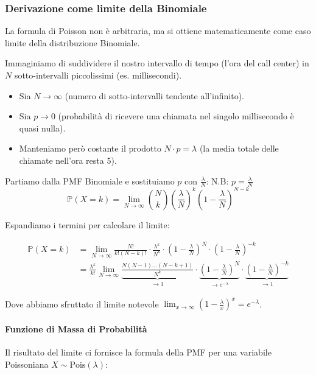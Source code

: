 \subsubsection{Derivazione come limite della Binomiale}

La formula di Poisson non è arbitraria, ma si ottiene matematicamente come caso limite della distribuzione Binomiale.

Immaginiamo di suddividere il nostro intervallo di tempo (l'ora del call center) in $N$ sotto-intervalli piccolissimi (es. millisecondi).
\begin{itemize}
    \item Sia $N \to \infty$ (numero di sotto-intervalli tendente all'infinito).
    \item Sia $p \to 0$ (probabilità di ricevere una chiamata nel singolo millisecondo è quasi nulla).
    \item Manteniamo però costante il prodotto $N \cdot p = \lambda$ (la media totale delle chiamate nell'ora resta 5).
\end{itemize}

Partiamo dalla PMF Binomiale e sostituiamo $p$ con $\frac{\lambda}{N}$:
N.B: ${p} = \frac{\lambda}{N}$
\[
\mathbb{P}(X=k) = \lim_{N \to \infty} \binom{N}{k} \left( \frac{\lambda}{N} \right)^k \left( 1 - \frac{\lambda}{N} \right)^{N-k}
\]

Espandiamo i termini per calcolare il limite:

\begin{equation}
\begin{aligned}
\mathbb{P}(X=k) &= \lim_{N \to \infty} \frac{N!}{k!(N-k)!} \cdot \frac{\lambda^k}{N^k} \cdot \left( 1 - \frac{\lambda}{N} \right)^N \cdot \left( 1 - \frac{\lambda}{N} \right)^{-k} \\
&= \frac{\lambda^k}{k!} \lim_{N \to \infty} \underbrace{\frac{N(N-1)\dots(N-k+1)}{N^k}}_{\to 1} \cdot \underbrace{\left( 1 - \frac{\lambda}{N} \right)^N}_{\to e^{-\lambda}} \cdot \underbrace{\left( 1 - \frac{\lambda}{N} \right)^{-k}}_{\to 1}
\end{aligned}
\end{equation}

Dove abbiamo sfruttato il limite notevole $\lim_{x \to \infty} (1 - \frac{\lambda}{x})^x = e^{-\lambda}$.

\paragraph{Funzione di Massa di Probabilità}
Il risultato del limite ci fornisce la formula della PMF per una variabile Poissoniana $X \sim \text{Pois}(\lambda)$:

